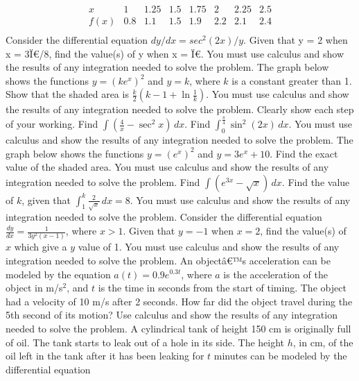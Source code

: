 \documentclass[12pt,addpoints]{exam}
\begin{document}
\begin{questions}
\[
\begin{array}{c|ccccccc}
x & 1 & 1.25 & 1.5 & 1.75 & 2 & 2.25 & 2.5 \\
\hline
f(x) & 0.8 & 1.1 & 1.5 & 1.9 & 2.2 & 2.1 & 2.4 \\
\end{array}
\]
\fillwithlines{5cm}
\question[5] Consider the differential equation \(dy/dx = sec^2(2x) / y\). Given that y = 2 when x = 3Ï€/8, find the value(s) of y when x = Ï€. You must use calculus and show the results of any integration needed to solve the problem.
\fillwithlines{5cm}
\question[5] The graph below shows the functions \( y = (ke^x)^2 \) and \( y = k \), where \( k \) is a constant greater than 1. Show that the shaded area is \(\frac{k}{2} \left( k - 1 + \ln \frac{1}{k} \right)\). You must use calculus and show the results of any integration needed to solve the problem. Clearly show each step of your working.
\fillwithlines{5cm}
\question[5] Find \(\int \left( \frac{4}{x} - \sec^2 x \right) \, dx\).
\fillwithlines{5cm}
\question[5] Find \(\int_{0}^{\frac{\pi}{4}} \sin^2(2x) \, dx\). You must use calculus and show the results of any integration needed to solve the problem.
\fillwithlines{5cm}
\question[5] The graph below shows the functions \( y = (e^x)^2 \) and \( y = 3e^x + 10 \). Find the exact value of the shaded area. You must use calculus and show the results of any integration needed to solve the problem.
\fillwithlines{5cm}
\question[5] Find \(\int (e^{3x} - \sqrt{x}) \, dx\).
\fillwithlines{5cm}
\question[5] Find the value of \( k \), given that \(\int_{1}^{k} \frac{2}{\sqrt{x}} \, dx = 8\). You must use calculus and show the results of any integration needed to solve the problem.
\fillwithlines{5cm}
\question[5] Consider the differential equation \( \frac{dy}{dx} = \frac{1}{3y^2(x-1)} \), where \( x > 1 \). Given that \( y = -1 \) when \( x = 2 \), find the value(s) of \( x \) which give a \( y \) value of 1. You must use calculus and show the results of any integration needed to solve the problem.
\fillwithlines{5cm}
\question[5] An objectâ€™s acceleration can be modeled by the equation \( a(t) = 0.9e^{0.3t} \), where \( a \) is the acceleration of the object in m/s\(^2\), and \( t \) is the time in seconds from the start of timing. The object had a velocity of 10 m/s after 2 seconds. How far did the object travel during the 5th second of its motion? Use calculus and show the results of any integration needed to solve the problem.
\fillwithlines{5cm}
\question[5] A cylindrical tank of height 150 cm is originally full of oil. The tank starts to leak out of a hole in its side. The height \( h \), in cm, of the oil left in the tank after it has been leaking for \( t \) minutes can be modeled by the differential equation


\end{questions}
\end{document}

